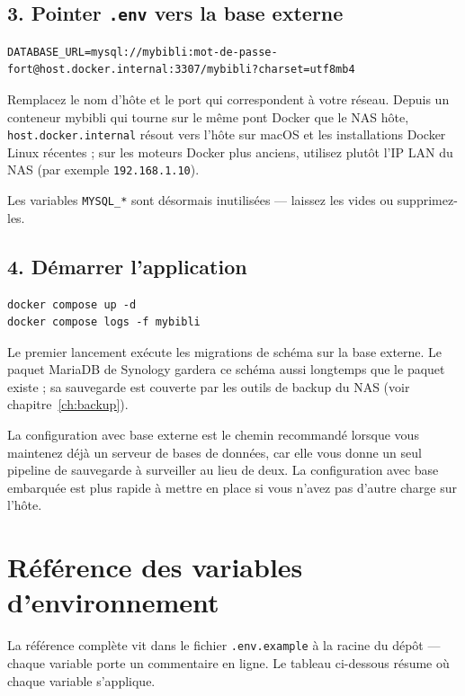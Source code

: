 \subsection*{3. Pointer \texttt{.env} vers la base externe}

\begin{lstlisting}
DATABASE_URL=mysql://mybibli:mot-de-passe-fort@host.docker.internal:3307/mybibli?charset=utf8mb4
\end{lstlisting}

Remplacez le nom d'hôte et le port qui correspondent à votre réseau.
Depuis un conteneur mybibli qui tourne sur le même pont Docker que
le NAS hôte, \texttt{host.docker.internal} résout vers l'hôte sur
macOS et les installations Docker Linux récentes ; sur les moteurs
Docker plus anciens, utilisez plutôt l'IP LAN du NAS (par exemple
\texttt{192.168.1.10}).

Les variables \texttt{MYSQL\_*} sont désormais inutilisées — laissez
les vides ou supprimez-les.

\subsection*{4. Démarrer l'application}

\begin{lstlisting}
docker compose up -d
docker compose logs -f mybibli
\end{lstlisting}

Le premier lancement exécute les migrations de schéma sur la base
externe. Le paquet MariaDB de Synology gardera ce schéma aussi
longtemps que le paquet existe ; sa sauvegarde est couverte par les
outils de backup du NAS (voir chapitre~\ref{ch:backup}).

\begin{tip}
La configuration avec base externe est le chemin recommandé lorsque
vous maintenez déjà un serveur de bases de données, car elle vous
donne un seul pipeline de sauvegarde à surveiller au lieu de deux. La
configuration avec base embarquée est plus rapide à mettre en place
si vous n'avez pas d'autre charge sur l'hôte.
\end{tip}

\section{Référence des variables d'environnement}\label{sec:env-vars}

La référence complète vit dans le fichier
\texttt{.env.example} à la racine
du dépôt — chaque variable porte un commentaire en ligne. Le tableau
ci-dessous résume où chaque variable s'applique.

